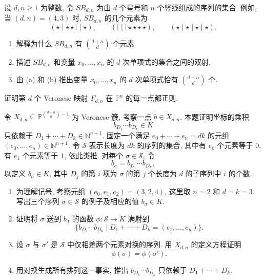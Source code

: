 \BookExerciseHeading
\begin{BookExercises}
  \item\label{ex:count-veronese-monomials-by-stars-and-bars} 设 $d,n\ge1$ 为整数, 令 $SB_{d,n}$ 为由 $d$ 个\textquotedbl{}星号\textquotedbl{}和 $n$ 个\textquotedbl{}竖线\textquotedbl{}组成的序列的集合. 例如, 当 $(d,n)=(4,3)$ 时, $SB_{d,n}$ 的几个元素为
  \[
    (\star\mid\star\star\mid\mid\star),\qquad
    (\mid\mid\mid\star\star\star\star),\qquad
    (\star\mid\star\mid\star\mid\star).
  \]
  \begin{enumerate}
    \item 解释为什么 $SB_{d,n}$ 有 $\binom{d+n}{d}$ 个元素.
    \item 描述 $SB_{d,n}$ 和变量 $x_{0},\ldots,x_{n}$ 的 $d$ 次单项式的集合之间的双射.
    \item 由 (a) 和 (b) 推出变量 $x_{0},\ldots,x_{n}$ 的 $d$ 次单项式恰有 $\binom{d+n}{d}$ 个.
  \end{enumerate}
  \item\label{ex:veronese-monomials-have-no-common-zero} 证明第 $d$ 个 Veronese 映射 $F_{d,n}$ 在 $\mathbb{P}^{n}$ 的每一点都正则.
  \item\label{ex:veronese-coordinate-products-depend-on-sum} 令 $X_{d,n}\subseteq\mathbb{P}^{\binom{d+n}{d}-1}$ 为 Veronese 簇, 考察一点 $b\in X_{d,n}$. 本题证明坐标的乘积
  \[
    b_{D_{1}}\cdots b_{D_{k}}\in K
  \]
  只依赖于 $D_{1}+\cdots+D_{k}\in\mathbb{N}^{n+1}$. 固定一个满足 $e_{0}+\cdots+e_{n}=dk$ 的元组 $(e_{0},\ldots,e_{n})\in\mathbb{N}^{n+1}$. 令 $\mathcal{S}$ 表示长度为 $dk$ 的序列的集合, 其中有 $e_{0}$ 个元素等于 $0$, 有 $e_{1}$ 个元素等于 $1$, 依此类推. 对每个 $\sigma\in\mathcal{S}$, 令
  \[
    b_{\sigma}=b_{D_{1}}\cdots b_{D_{k}},
  \]
  以定义 $b_{\sigma}\in K$, 其中 $D_{j}$ 的第 $i$ 项为 $\sigma$ 的第 $j$ 个长度为 $d$ 的子序列中 $i$ 的个数.
  \begin{enumerate}
    \item 为理解记号, 考察元组 $(e_{0},e_{1},e_{2})=(3,2,4)$, 这里取 $n=2$ 和 $d=k=3$. 写出三个序列 $\sigma\in\mathcal{S}$ 的例子及相应的值 $b_{\sigma}\in K$.
    \item 证明将 $\sigma$ 送到 $b_{\sigma}$ 的函数 $\phi:\mathcal{S}\to K$ 满射到
    \[
      \{b_{D_{1}}\cdots b_{D_{k}}\mid D_{1}+\cdots+D_{k}=(e_{1},\ldots,e_{n})\}.
    \]
    \item 设 $\sigma$ 与 $\sigma'$ 是 $\mathcal{S}$ 中仅相差两个元素对换的序列. 用 $X_{d,n}$ 的定义方程证明
    \[
      \phi(\sigma)=\phi(\sigma').
    \]
    \item 用对换生成所有排列这一事实, 推出 $b_{D_{1}}\cdots b_{D_{k}}$ 只依赖于 $D_{1}+\cdots+D_{k}$.

\end{enumerate}
\end{BookExercises}
